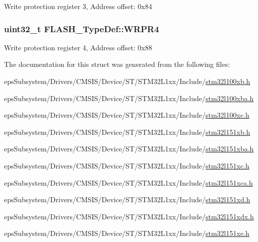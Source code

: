 Write protection register 3, Address offset\-: 0x84 \hypertarget{struct_f_l_a_s_h___type_def_ab49b7f13f436cf3909e256646e330b78}{
\subsubsection[{W\-R\-P\-R4}]{ uint32\-\_\-t F\-L\-A\-S\-H\-\_\-\-Type\-Def\-::\-W\-R\-P\-R4}}\label{struct_f_l_a_s_h___type_def_ab49b7f13f436cf3909e256646e330b78}
Write protection register 4, Address offset\-: 0x88 

The documentation for this struct was generated from the following files\-:\begin{DoxyCompactItemize}
\item 
eps\-Subsystem/\-Drivers/\-C\-M\-S\-I\-S/\-Device/\-S\-T/\-S\-T\-M32\-L1xx/\-Include/\hyperlink{stm32l100xb_8h}{stm32l100xb.\-h}\item 
eps\-Subsystem/\-Drivers/\-C\-M\-S\-I\-S/\-Device/\-S\-T/\-S\-T\-M32\-L1xx/\-Include/\hyperlink{stm32l100xba_8h}{stm32l100xba.\-h}\item 
eps\-Subsystem/\-Drivers/\-C\-M\-S\-I\-S/\-Device/\-S\-T/\-S\-T\-M32\-L1xx/\-Include/\hyperlink{stm32l100xc_8h}{stm32l100xc.\-h}\item 
eps\-Subsystem/\-Drivers/\-C\-M\-S\-I\-S/\-Device/\-S\-T/\-S\-T\-M32\-L1xx/\-Include/\hyperlink{stm32l151xb_8h}{stm32l151xb.\-h}\item 
eps\-Subsystem/\-Drivers/\-C\-M\-S\-I\-S/\-Device/\-S\-T/\-S\-T\-M32\-L1xx/\-Include/\hyperlink{stm32l151xba_8h}{stm32l151xba.\-h}\item 
eps\-Subsystem/\-Drivers/\-C\-M\-S\-I\-S/\-Device/\-S\-T/\-S\-T\-M32\-L1xx/\-Include/\hyperlink{stm32l151xc_8h}{stm32l151xc.\-h}\item 
eps\-Subsystem/\-Drivers/\-C\-M\-S\-I\-S/\-Device/\-S\-T/\-S\-T\-M32\-L1xx/\-Include/\hyperlink{stm32l151xca_8h}{stm32l151xca.\-h}\item 
eps\-Subsystem/\-Drivers/\-C\-M\-S\-I\-S/\-Device/\-S\-T/\-S\-T\-M32\-L1xx/\-Include/\hyperlink{stm32l151xd_8h}{stm32l151xd.\-h}\item 
eps\-Subsystem/\-Drivers/\-C\-M\-S\-I\-S/\-Device/\-S\-T/\-S\-T\-M32\-L1xx/\-Include/\hyperlink{stm32l151xdx_8h}{stm32l151xdx.\-h}\item 
eps\-Subsystem/\-Drivers/\-C\-M\-S\-I\-S/\-Device/\-S\-T/\-S\-T\-M32\-L1xx/\-Include/\hyperlink{stm32l151xe_8h}{stm32l151xe.\-h}\item 

\end{DoxyCompactItemize}
